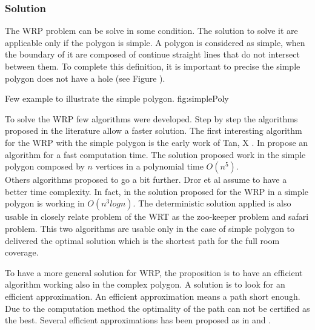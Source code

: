 
 
\subsubsection{Solution} 

The WRP problem can be solve in some condition. The solution to solve it are applicable only if the polygon is simple. A polygon is considered as simple, when the boundary of it are composed of continue straight lines that do not intersect between them. To complete this definition, it is important to precise the simple polygon does not have a hole (see Figure ). 
 \begin{mfigures}[!]
{Few example to illustrate the simple polygon. }{fig:simplePoly} \centering
{}
\hspace{1cm}
\hspace{1cm}
\end{mfigures}	

To solve the WRP few algorithms were developed. Step by step the algorithms proposed in the literature allow a faster solution. The first interesting algorithm for the WRP with the simple polygon is the early work of Tan, X \cite{234*tan2001}. In \citep{234*tan2001}  propose an algorithm for a fast computation time. The solution proposed work in the simple polygon composed by $n$ vertices in a polynomial time $O(n^5)$. \\
Others algorithms proposed to go a bit further. Dror et al \cite{233*dror2003} assume to have a better  time complexity. In fact, in \cite{233*dror2003} the solution proposed for the WRP in a simple polygon is working in $O(n^3 log n)$.  The deterministic solution applied is also usable in closely relate problem of the WRT as the zoo-keeper problem and safari problem.
This two algorithms \citep{234*tan2001,233*dror2003} are usable only in the case of simple polygon to delivered the optimal solution which is the shortest path for the full room coverage. 

To have a more general solution for WRP, the proposition is to have an efficient algorithm working also in the complex polygon. A solution is to look for an efficient approximation. An efficient approximation means a path short enough.  Due to the computation method the optimality of the path can not be certified as the best.
Several efficient approximations has been proposed as in \citep{235*faigl2010} and \citep{53*packer2008}. 

